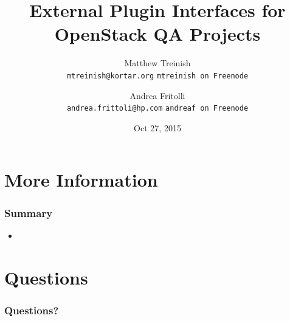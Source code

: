 \documentclass[aspectratio=169,11pt,hyperref={colorlinks=true}]{beamer}
\begin{document}
\title[External Plugin Interfaces for OpenStack QA Projects
\hspace{2em}\insertframenumber/\inserttotalframenumber]{External Plugin Interfaces for OpenStack QA Projects}
\author{Matthew Treinish\\
    \texttt{mtreinish@kortar.org}\newline\newline
    \texttt{mtreinish on Freenode}}
\author{Andrea Fritolli\\
     \texttt{andrea.frittoli@hp.com}\newline\newline
     \texttt{andreaf on Freenode}}
\date{Oct 27, 2015}

\begin{frame}
    \titlepage{}
\end{frame}

\section{More Information}
\begin{frame}
    \frametitle{Summary}
    \begin{itemize}
    \item 
\end{itemize}
\end{frame}

\section{Questions}
\begin{frame}
\frametitle{Questions?}
\end{frame}

\end{document}
